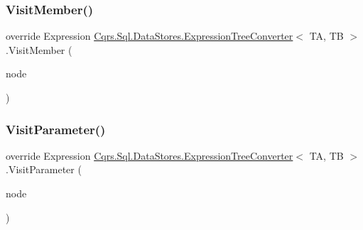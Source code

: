 \subsubsection{\texorpdfstring{Visit\+Member()}{VisitMember()}}
{\footnotesize\ttfamily override Expression \hyperlink{classCqrs_1_1Sql_1_1DataStores_1_1ExpressionTreeConverter}{Cqrs.\+Sql.\+Data\+Stores.\+Expression\+Tree\+Converter}$<$ TA, TB $>$.Visit\+Member (\begin{DoxyParamCaption}\item[{Member\+Expression}]{node }\end{DoxyParamCaption})\hspace{0.3cm}{\ttfamily [protected]}}

\mbox{\label{classCqrs_1_1Sql_1_1DataStores_1_1ExpressionTreeConverter_a88eef3bef4d4ad3caab1cd2cc033873b_a88eef3bef4d4ad3caab1cd2cc033873b}} 
\subsubsection{\texorpdfstring{Visit\+Parameter()}{VisitParameter()}}
{\footnotesize\ttfamily override Expression \hyperlink{classCqrs_1_1Sql_1_1DataStores_1_1ExpressionTreeConverter}{Cqrs.\+Sql.\+Data\+Stores.\+Expression\+Tree\+Converter}$<$ TA, TB $>$.Visit\+Parameter (\begin{DoxyParamCaption}\item[{Parameter\+Expression}]{node }\end{DoxyParamCaption})\hspace{0.3cm}{\ttfamily [protected]}}

